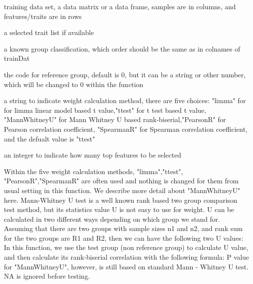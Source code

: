 \documentclass[letterpaper]{book}
\begin{document}
%
\begin{Arguments}
\begin{ldescription}
\item[\code{trainDat}] training data set, a data matrix or a data frame, samples are in columns, 
and features/traits are in rows

\item[\code{selectedTraits}] a selected trait list if available

\item[\code{groupInfo}] a known group classification, which order should be the same as in colnames of trainDat

\item[\code{refGroup}] the code for reference group, default is 0, but it can be a string or other number, 
which will be changed to 0 within the function

\item[\code{weightMethod}] a string to indicate weight calculation method, there are five choices: 
"limma" for for limma linear model based t value,"ttest" for t test based t value, 
"MannWhitneyU" for Mann Whitney U based rank-biserial,"PearsonR" for Pearson correlation coefficient,
"SpearmanR" for Spearman correlation coefficient, and the defualt value is "ttest"

\item[\code{topN}] an integer to indicate how many top features to be selected
\end{ldescription}
\end{Arguments}
%
\begin{Details}\relax
Within the five weight calculation methods, "limma","ttest", "PearsonR","SpearmanR" are often used and nothing 
is changed for them from usual setting in this function. We describe more detail about "MannWhitneyU" here. 
Mann-Whitney U test is a well known rank based two group comparison test method, but its statistics value U is not easy 
to use for weight. U can be calculated in two different ways depending on which group we stand for. 
Assuming that there are two groups with sample sizes n1 and n2, and rank sum for the two groups are R1 and R2, 
then we can have the following two U values:
In this function, we use the test group (non reference group) to calculate U value, and then calculate 
its rank-biserial correlation with the following formula:
P value for "MannWhitneyU", however, is still based on standard Mann - Whitney U test.
NA is ignored before testing.
\end{Details}
\end{document}
